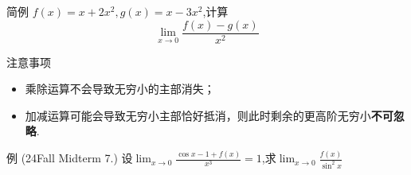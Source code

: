 \documentclass[]{beamer}
\begin{document}
\begin{frame}{简例}
    $f(x)=x+2x^2,g(x)=x-3x^2$,计算
    \[
    \lim_{x\rightarrow 0}\frac{f(x)-g(x)}{x^2}
    \]
\end{frame}

\begin{frame}{注意事项}
    \begin{itemize}
        \item 乘除运算不会导致无穷小的主部消失；
        \item 加减运算可能会导致无穷小主部恰好抵消，则此时剩余的更高阶无穷小\textbf{不可忽略}.
    \end{itemize}
\end{frame}

\begin{frame}{例 (24Fall Midterm 7.)}
    设$\displaystyle\lim_{x\rightarrow0}\frac{\cos x - 1 + f(x)}{x^3}=1$,求$\displaystyle\lim_{x\rightarrow0}\frac{f(x)}{\sin^2x}$
\end{frame}


\end{document}
